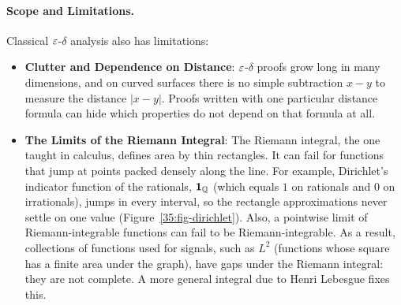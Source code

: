 \paragraph{Scope and Limitations.}
Classical $\varepsilon$-$\delta$ analysis also has limitations:
\begin{itemize}
  \item \textbf{Clutter and Dependence on Distance}: $\varepsilon$-$\delta$ proofs grow long in many dimensions, and on curved surfaces there is no simple subtraction $x - y$ to measure the distance $|x - y|$. Proofs written with one particular distance formula can hide which properties do not depend on that formula at all.
  \item \textbf{The Limits of the Riemann Integral}: The Riemann integral, the one taught in calculus, defines area by thin rectangles. It can fail for functions that jump at points packed densely along the line. For example, Dirichlet's indicator function of the rationals, $\mathbf{1}_{\mathbb{Q}}$ (which equals $1$ on rationals and $0$ on irrationals), jumps in every interval, so the rectangle approximations never settle on one value (Figure~\ref{35:fig-dirichlet}). Also, a pointwise limit of Riemann-integrable functions can fail to be Riemann-integrable. As a result, collections of functions used for signals, such as $L^2$ (functions whose square has a finite area under the graph), have gaps under the Riemann integral: they are not complete. A more general integral due to Henri Lebesgue fixes this.
\end{itemize}

